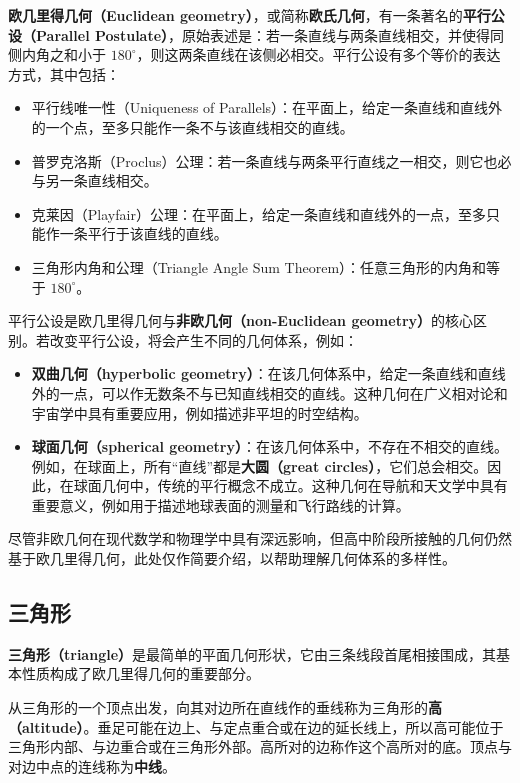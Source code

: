 \textbf{欧几里得几何（Euclidean geometry）}，或简称\textbf{欧氏几何}，有一条著名的\textbf{平行公设（Parallel Postulate）}，原始表述是：若一条直线与两条直线相交，并使得同侧内角之和小于 $180^\circ$，则这两条直线在该侧必相交。平行公设有多个等价的表达方式，其中包括：
\begin{itemize}
\item 平行线唯一性（Uniqueness of Parallels）：在平面上，给定一条直线和直线外的一个点，至多只能作一条不与该直线相交的直线。
\item 普罗克洛斯（Proclus）公理：若一条直线与两条平行直线之一相交，则它也必与另一条直线相交。
\item 克莱因（Playfair）公理：在平面上，给定一条直线和直线外的一点，至多只能作一条平行于该直线的直线。
\item 三角形内角和公理（Triangle Angle Sum Theorem）：任意三角形的内角和等于 $180^\circ$。
\end{itemize}

平行公设是欧几里得几何与\textbf{非欧几何（non-Euclidean geometry）}的核心区别。若改变平行公设，将会产生不同的几何体系，例如：

\begin{itemize}
\item \textbf{双曲几何（hyperbolic geometry）}：在该几何体系中，给定一条直线和直线外的一点，可以作无数条不与已知直线相交的直线。这种几何在广义相对论和宇宙学中具有重要应用，例如描述非平坦的时空结构。
\item \textbf{球面几何（spherical geometry）}：在该几何体系中，不存在不相交的直线。例如，在球面上，所有“直线”都是\textbf{大圆（great circles）}，它们总会相交。因此，在球面几何中，传统的平行概念不成立。这种几何在导航和天文学中具有重要意义，例如用于描述地球表面的测量和飞行路线的计算。
\end{itemize}

尽管非欧几何在现代数学和物理学中具有深远影响，但高中阶段所接触的几何仍然基于欧几里得几何，此处仅作简要介绍，以帮助理解几何体系的多样性。

\subsection{三角形}

\textbf{三角形（triangle）}是最简单的平面几何形状，它由三条线段首尾相接围成，其基本性质构成了欧几里得几何的重要部分。

从三角形的一个顶点出发，向其对边所在直线作的垂线称为三角形的\textbf{高（altitude）}。垂足可能在边上、与定点重合或在边的延长线上，所以高可能位于三角形内部、与边重合或在三角形外部。高所对的边称作这个高所对的底。顶点与对边中点的连线称为\textbf{中线}。

